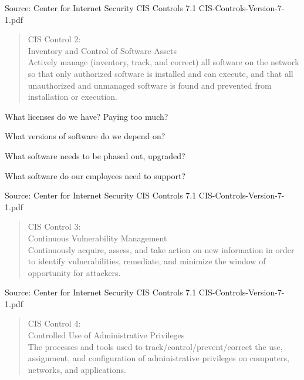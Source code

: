 \documentclass[Screen16to9,17pt]{foils}
\begin{document}
Source: Center for Internet Security CIS Controls 7.1 CIS-Controls-Version-7-1.pdf



\begin{quote}
CIS Control 2:\\
Inventory and Control of Software Assets\\
Actively manage (inventory, track, and correct) all software on the network so that only authorized software is installed and can execute, and that all unauthorized and unmanaged software is found and prevented from installation or execution.
\end{quote}

\begin{list1}
\item What licenses do we have? Paying too much?
\item What versions of software do we depend on?
\item What software needs to be phased out, upgraded?
\item What software do our employees need to support?
\end{list1}

Source: Center for Internet Security CIS Controls 7.1 CIS-Controls-Version-7-1.pdf


\begin{quote}
CIS Control 3:\\
Continuous Vulnerability Management\\
Continuously acquire, assess, and take action on new information in order to identify vulnerabilities, remediate, and minimize the window of opportunity for attackers.
\end{quote}

\begin{list1}
\item
\item
\item
\item
\end{list1}

Source: Center for Internet Security CIS Controls 7.1 CIS-Controls-Version-7-1.pdf


\begin{quote}
CIS Control 4:\\
Controlled Use of Administrative Privileges\\
The processes and tools used to track/control/prevent/correct the use, assignment, and configuration of administrative privileges on computers, networks, and applications.
\end{quote}
\end{document}
